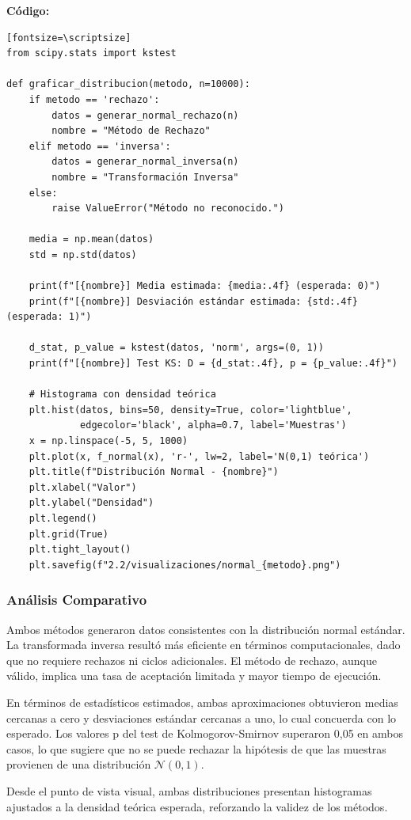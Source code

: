 \documentclass{article}
\begin{document}
\textbf{Código:}
\begin{verbatim}[fontsize=\scriptsize]
from scipy.stats import kstest

def graficar_distribucion(metodo, n=10000):
    if metodo == 'rechazo':
        datos = generar_normal_rechazo(n)
        nombre = "Método de Rechazo"
    elif metodo == 'inversa':
        datos = generar_normal_inversa(n)
        nombre = "Transformación Inversa"
    else:
        raise ValueError("Método no reconocido.")

    media = np.mean(datos)
    std = np.std(datos)

    print(f"[{nombre}] Media estimada: {media:.4f} (esperada: 0)")
    print(f"[{nombre}] Desviación estándar estimada: {std:.4f} (esperada: 1)")

    d_stat, p_value = kstest(datos, 'norm', args=(0, 1))
    print(f"[{nombre}] Test KS: D = {d_stat:.4f}, p = {p_value:.4f}")

    # Histograma con densidad teórica
    plt.hist(datos, bins=50, density=True, color='lightblue',
             edgecolor='black', alpha=0.7, label='Muestras')
    x = np.linspace(-5, 5, 1000)
    plt.plot(x, f_normal(x), 'r-', lw=2, label='N(0,1) teórica')
    plt.title(f"Distribución Normal - {nombre}")
    plt.xlabel("Valor")
    plt.ylabel("Densidad")
    plt.legend()
    plt.grid(True)
    plt.tight_layout()
    plt.savefig(f"2.2/visualizaciones/normal_{metodo}.png")
\end{verbatim}

\subsubsection{Análisis Comparativo}
Ambos métodos generaron datos consistentes con la distribución normal estándar. La transformada inversa resultó más eficiente en términos computacionales, dado que no requiere rechazos ni ciclos adicionales. El método de rechazo, aunque válido, implica una tasa de aceptación limitada y mayor tiempo de ejecución.

En términos de estadísticos estimados, ambas aproximaciones obtuvieron medias cercanas a cero y desviaciones estándar cercanas a uno, lo cual concuerda con lo esperado. Los valores p del test de Kolmogorov-Smirnov superaron 0{,}05 en ambos casos, lo que sugiere que no se puede rechazar la hipótesis de que las muestras provienen de una distribución $\mathcal{N}(0,1)$.

Desde el punto de vista visual, ambas distribuciones presentan histogramas ajustados a la densidad teórica esperada, reforzando la validez de los métodos.
\end{document}

